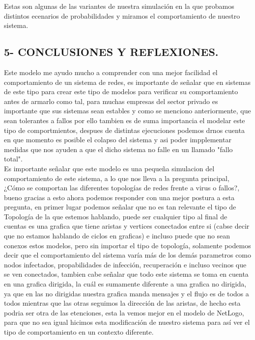 \documentclass[12pt]{article}
\begin{document}
Estas son algunas de las variantes de nuestra simulación en la que probamos distintos ecenarios de probabilidades y miramos el comportamiento de nuestro sistema.\\


{\color{blue} \subsection*{5- CONCLUSIONES Y REFLEXIONES.}}
\vspace{1em}

Este modelo me ayudo mucho a comprender con una mejor facilidad el comportamiento de un sistema de redes, es importante de señalar que en sistemas de este tipo para crear este tipo de modelos para verificar su comportamiento antes de armarlo como tal, para muchas empresas del sector privado es importante que sus sistemas sean estables y como se menciono anteriormente, que sean tolerantes a fallos
por ello tambien es de suma importancia el modelar este tipo de comportmientos, despues de distintas ejecuciones podemos drnos cuenta en que momento es posible el colapso del sistema y asi poder impplementar medidas que nos ayuden a que el dicho sistema no falle en un llamado "fallo total".\\

Es importante señalar que este modelo es una pequeña simulacion del comportamiento de este sistema, a lo que nos lleva a la pregunta principal, ¿Cómo se comportan las diferentes topologías de redes frente a virus o fallos?, bueno gracias a esto ahora podemos responder con una mejor postura a esta pregunta, en primer lugar podemos señalar que no es tan relevante el tipo de Topología de la que estemos hablando, puede
ser cualquier tipo al final de cuentas es una grafica que tiene aristas y vertices conectados entre si (cabse decir que no estamos hablando de ciclos en graficas) e incluso puede que no sean conexos estos modelos, pero sin importar el tipo de topología, solamente
podemos decir que el comportamiento del sistema varía más de los demás parametros como nodos infectados, propabilidades de infección, recuperación e incluso vecinos que se ven conectados, tambien cabe señalar que todo este sistema se toma en cuenta en una grafica dirigida, la cuál es sumamente diferente a una grafica no dirigida, ya que en las no dirigidas nuestra grafica manda mensajes y el flujo es de todos a todos mientras que las otras
seguimos la dirección de las aristas, de hecho esta podria ser otra de las etenciones, esta la vemos mejor en el modelo de NetLogo, para que no sea igual hicimos esta modificación de nuestro sistema para así ver el tipo de comportamiento en un contexto diferente.\\
\end{document}
